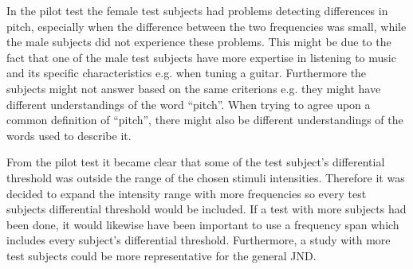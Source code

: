 In the pilot test the female test subjects had problems detecting differences in pitch, especially when the difference between the two frequencies was small, while the male subjects did not experience these problems. This might be due to the fact that one of the male test subjects have more expertise in listening to music and its specific characteristics e.g. when tuning a guitar. Furthermore the subjects might not answer based on the same criterions e.g. they might have different understandings of the word “pitch”. When trying to agree upon a common definition of “pitch”, there might also be different understandings of the words used to describe it.  

From the pilot test it became clear that some of the test subject’s differential threshold was outside the range of the chosen stimuli intensities. Therefore it was decided to expand the intensity range with more frequencies so every test subjects differential threshold would be included. If a test with more subjects had been done, it would likewise have been important to use a frequency span which includes every subject’s differential threshold. Furthermore, a study with more test subjects could be more representative for the general JND. 





 
